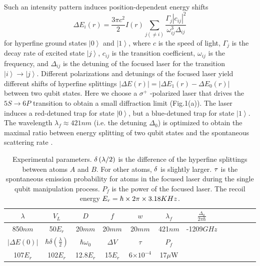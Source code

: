 \documentclass[pra,aps,showpacs,twocolumn]{revtex4}
\begin{document}
Such an intensity pattern induces position-dependent energy shifts \cite%
{Jessen}%
\begin{equation}
\Delta E_{i}\left( r\right) =\frac{3\pi c^{2}}{2}I\left( r\right)
\sum_{j\left( \neq i\right) }\frac{\Gamma _{j}\left\vert c_{ij}\right\vert
^{2}}{\omega _{ij}^{3}\Delta _{ij}}  \label{eshift1}
\end{equation}%
for hyperfine ground states $\left\vert 0\right\rangle $ and $\left\vert
1\right\rangle $, where $c$ is the speed of light, $\Gamma _{j}$ is the
decay rate of excited state $\left\vert j\right\rangle $, $c_{ij}$ is the
transition coefficient, $\omega _{ij}$ is the frequency, and $\Delta _{ij}$
is the detuning of the focused laser for the transition $\left\vert
i\right\rangle \rightarrow \left\vert j\right\rangle $. Different
polarizations and detunings of the focused laser yield different shifts of
hyperfine splittings $\left\vert \Delta E\left( r\right) \right\vert
=\left\vert \Delta E_{1}\left( r\right) -\Delta E_{0}\left( r\right)
\right\vert $ between two qubit states. Here we choose a $\sigma ^{+}$%
-polarized laser that drives the $5S\rightarrow 6P$ transition \cite%
{footnote} to obtain a small diffraction limit (Fig.1(a)). The laser induces
a red-detuned trap for state $\left\vert 0\right\rangle $, but a
blue-detuned trap for state $\left\vert 1\right\rangle $. The wavelength $%
\lambda _{f}\approx 421nm$ (i.e. the detuning $\Delta _{0}$) is optimized to
obtain the maximal ratio between energy splitting of two qubit states and
the spontaneous scattering rate \cite{Mandel1}.

\begin{table}[b]
\caption{Experimental parameters. $\protect\delta \left( \protect\lambda %
/2\right) $ is the difference of the hyperfine splittings between atoms $A$
and $B$. For other atoms, $\protect\delta $ is slightly larger. $\protect%
\tau $ is the spontaneous emission probability for atoms in the focused
laser during the single qubit manipulation process. $P_{f}$ is the power of
the focused laser. The recoil energy $E_{r}=\hbar \times 2\protect\pi \times
3.18KHz$.}%
\begin{ruledtabular}
\begin{tabular}{cccccccccccc}
$\lambda $ & $V_{L}$ & $D$ & $f$ & $w$ & $\lambda _{f}$ & $\frac{\Delta _{0}}{2\pi
\hbar} $   
  \\ 
\hline 
850$nm$ & 50$E_{r}$ & 20$mm$ & 20$mm$ & 20$mm$ & 421$nm$ & -1209$GHz$ &  \\
\hline
\hline
$|\Delta E\left( 0\right)| $ & $\hbar \delta \left( \frac{\lambda }{2}\right) $ & $\hbar \omega_{0}$ & $\Delta V$ & $\tau $ & $P_{f}$ \\
\hline
107$E_{r}$ & 102$E_{r}$ & 12.8$E_{r}$ & 15$E_{r}$ & 6$\times 10^{-4}$ & 17$\mu$W

\end{tabular}
\end{ruledtabular}
\end{table}
\end{document}
